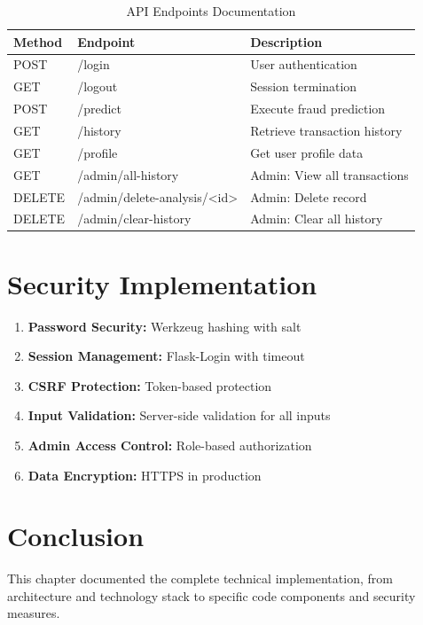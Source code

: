 \documentclass[12pt,a4paper,twoside]{report}
\begin{document}
\begin{table}[H]
    \centering
    \begin{tabular}{|l|l|l|}
        \hline
        \textbf{Method} & \textbf{Endpoint} & \textbf{Description} \\
        \hline
        POST & /login & User authentication \\
        GET & /logout & Session termination \\
        POST & /predict & Execute fraud prediction \\
        GET & /history & Retrieve transaction history \\
        GET & /profile & Get user profile data \\
        GET & /admin/all-history & Admin: View all transactions \\
        DELETE & /admin/delete-analysis/<id> & Admin: Delete record \\
        DELETE & /admin/clear-history & Admin: Clear all history \\
        \hline
    \end{tabular}
    \caption{API Endpoints Documentation}
\end{table}

\section{Security Implementation}

\begin{enumerate}
    \item \textbf{Password Security:} Werkzeug hashing with salt
    \item \textbf{Session Management:} Flask-Login with timeout
    \item \textbf{CSRF Protection:} Token-based protection
    \item \textbf{Input Validation:} Server-side validation for all inputs
    \item \textbf{Admin Access Control:} Role-based authorization
    \item \textbf{Data Encryption:} HTTPS in production
\end{enumerate}

\section{Conclusion}

This chapter documented the complete technical implementation, from architecture and technology stack to specific code components and security measures.
\end{document}
